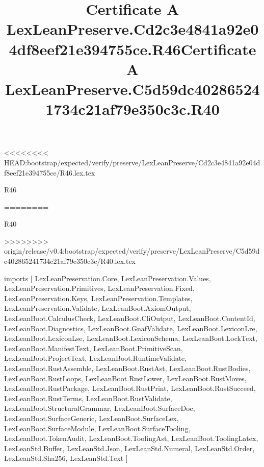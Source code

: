 <<<<<<<< HEAD:bootstrap/expected/verify/preserve/LexLeanPreserve/Cd2c3e4841a92e04df8eef21e394755ce/R46.lex.tex
\begin{lexlean}{R46}
\title{Certificate A LexLeanPreserve.Cd2c3e4841a92e04df8eef21e394755ce.R46}
========
\begin{lexlean}{R40}
\title{Certificate A LexLeanPreserve.C5d59dc402865241734c21af79e350c3c.R40}
>>>>>>>> origin/release/v0.4:bootstrap/expected/verify/preserve/LexLeanPreserve/C5d59dc402865241734c21af79e350c3c/R40.lex.tex
\begin{coremodule}
imports [
  LexLeanPreservation.Core,
  LexLeanPreservation.Values,
  LexLeanPreservation.Primitives,
  LexLeanPreservation.Fixed,
  LexLeanPreservation.Keys,
  LexLeanPreservation.Templates,
  LexLeanPreservation.Validate,
  LexLeanBoot.AxiomOutput,
  LexLeanBoot.CalculusCheck,
  LexLeanBoot.CliOutput,
  LexLeanBoot.ContentId,
  LexLeanBoot.Diagnostics,
  LexLeanBoot.GnafValidate,
  LexLeanBoot.LexiconLre,
  LexLeanBoot.LexiconLse,
  LexLeanBoot.LexiconSchema,
  LexLeanBoot.LockText,
  LexLeanBoot.ManifestText,
  LexLeanBoot.PrimitiveScan,
  LexLeanBoot.ProjectText,
  LexLeanBoot.RuntimeValidate,
  LexLeanBoot.RustAssemble,
  LexLeanBoot.RustAst,
  LexLeanBoot.RustBodies,
  LexLeanBoot.RustLoops,
  LexLeanBoot.RustLower,
  LexLeanBoot.RustMoves,
  LexLeanBoot.RustPackage,
  LexLeanBoot.RustPrint,
  LexLeanBoot.RustSucceed,
  LexLeanBoot.RustTerms,
  LexLeanBoot.RustValidate,
  LexLeanBoot.StructuralGrammar,
  LexLeanBoot.SurfaceDoc,
  LexLeanBoot.SurfaceGeneric,
  LexLeanBoot.SurfaceLex,
  LexLeanBoot.SurfaceModule,
  LexLeanBoot.SurfaceTooling,
  LexLeanBoot.TokenAudit,
  LexLeanBoot.ToolingAst,
  LexLeanBoot.ToolingLatex,
  LexLeanStd.Buffer,
  LexLeanStd.Json,
  LexLeanStd.Numeral,
  LexLeanStd.Order,
  LexLeanStd.Sha256,
  LexLeanStd.Text
]


\end{coremodule}
\end{lexlean}
\end{lexlean}
